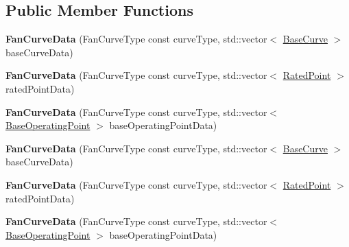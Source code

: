 \subsection*{Public Member Functions}
\begin{DoxyCompactItemize}
\item 
\mbox{\label{class_fan_curve_data_a2419372103465feb9dca675d5391c489}} 
{\bfseries Fan\+Curve\+Data} (Fan\+Curve\+Type const curve\+Type, std\+::vector$<$ \hyperlink{struct_fan_curve_data_1_1_base_curve}{Base\+Curve} $>$ base\+Curve\+Data)
\item 
\mbox{\label{class_fan_curve_data_aab50cc3aa6ac0208d02691af715d72bb}} 
{\bfseries Fan\+Curve\+Data} (Fan\+Curve\+Type const curve\+Type, std\+::vector$<$ \hyperlink{struct_fan_curve_data_1_1_rated_point}{Rated\+Point} $>$ rated\+Point\+Data)
\item 
\mbox{\label{class_fan_curve_data_a06a924f8d9b61eabc3fcaf2b32fc9bff}} 
{\bfseries Fan\+Curve\+Data} (Fan\+Curve\+Type const curve\+Type, std\+::vector$<$ \hyperlink{struct_fan_curve_data_1_1_base_operating_point}{Base\+Operating\+Point} $>$ base\+Operating\+Point\+Data)
\item 
\mbox{\label{class_fan_curve_data_a2419372103465feb9dca675d5391c489}} 
{\bfseries Fan\+Curve\+Data} (Fan\+Curve\+Type const curve\+Type, std\+::vector$<$ \hyperlink{struct_fan_curve_data_1_1_base_curve}{Base\+Curve} $>$ base\+Curve\+Data)
\item 
\mbox{\label{class_fan_curve_data_aab50cc3aa6ac0208d02691af715d72bb}} 
{\bfseries Fan\+Curve\+Data} (Fan\+Curve\+Type const curve\+Type, std\+::vector$<$ \hyperlink{struct_fan_curve_data_1_1_rated_point}{Rated\+Point} $>$ rated\+Point\+Data)
\item 
\mbox{\label{class_fan_curve_data_a06a924f8d9b61eabc3fcaf2b32fc9bff}} 
{\bfseries Fan\+Curve\+Data} (Fan\+Curve\+Type const curve\+Type, std\+::vector$<$ \hyperlink{struct_fan_curve_data_1_1_base_operating_point}{Base\+Operating\+Point} $>$ base\+Operating\+Point\+Data)
\item 
\mbox{\label{class_fan_curve_data_a2419372103465feb9dca675d5391c489}} 

\end{DoxyCompactItemize}

